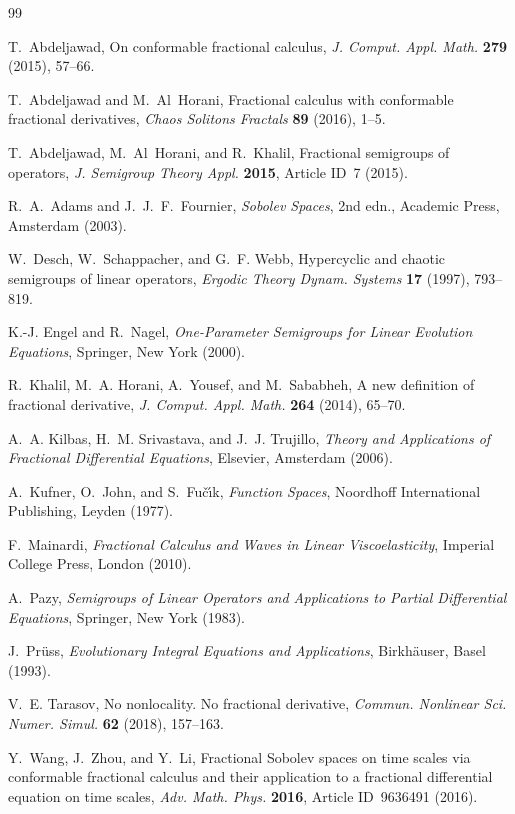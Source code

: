 \documentclass[preprint,12pt]{elsarticle}
\begin{document}
\begin{thebibliography}{99}

 T.~Abdeljawad, On conformable fractional calculus, \emph{J. Comput. Appl. Math.} \textbf{279} (2015), 57--66.

 T.~Abdeljawad and M.~Al~Horani, Fractional calculus with conformable fractional derivatives, \emph{Chaos Solitons Fractals} \textbf{89} (2016), 1--5.

 T.~Abdeljawad, M.~Al~Horani, and R.~Khalil, Fractional semigroups of operators, \emph{J. Semigroup Theory Appl.} \textbf{2015}, Article ID~7 (2015).

 R.~A.~Adams and J.~J.~F.~Fournier, \emph{Sobolev Spaces}, 2nd edn., Academic Press, Amsterdam (2003).

 W.~Desch, W.~Schappacher, and G.~F. Webb, Hypercyclic and chaotic semigroups of linear operators, \emph{Ergodic Theory Dynam. Systems} \textbf{17} (1997), 793--819.

 K.-J. Engel and R.~Nagel, \emph{One-Parameter Semigroups for Linear Evolution Equations}, Springer, New York (2000).

 R.~Khalil, M.~A. Horani, A.~Yousef, and M.~Sababheh, A new definition of fractional derivative, \emph{J. Comput. Appl. Math.} \textbf{264} (2014), 65--70.

 A.~A. Kilbas, H.~M. Srivastava, and J.~J. Trujillo, \emph{Theory and Applications of Fractional Differential Equations}, Elsevier, Amsterdam (2006).

 A.~Kufner, O.~John, and S.~Fu\v{c}\'{\i}k, \emph{Function Spaces}, Noordhoff International Publishing, Leyden (1977).

 F.~Mainardi, \emph{Fractional Calculus and Waves in Linear Viscoelasticity}, Imperial College Press, London (2010).

 A.~Pazy, \emph{Semigroups of Linear Operators and Applications to Partial Differential Equations}, Springer, New York (1983).

 J.~Pr{\"u}ss, \emph{Evolutionary Integral Equations and Applications}, Birkh{\"a}user, Basel (1993).

 V.~E. Tarasov, No nonlocality. No fractional derivative, \emph{Commun. Nonlinear Sci. Numer. Simul.} \textbf{62} (2018), 157--163.

 Y.~Wang, J.~Zhou, and Y.~Li, Fractional Sobolev spaces on time scales via conformable fractional calculus and their application to a fractional differential equation on time scales, \emph{Adv. Math. Phys.} \textbf{2016}, Article ID~9636491 (2016).

\end{thebibliography}
\end{document}
